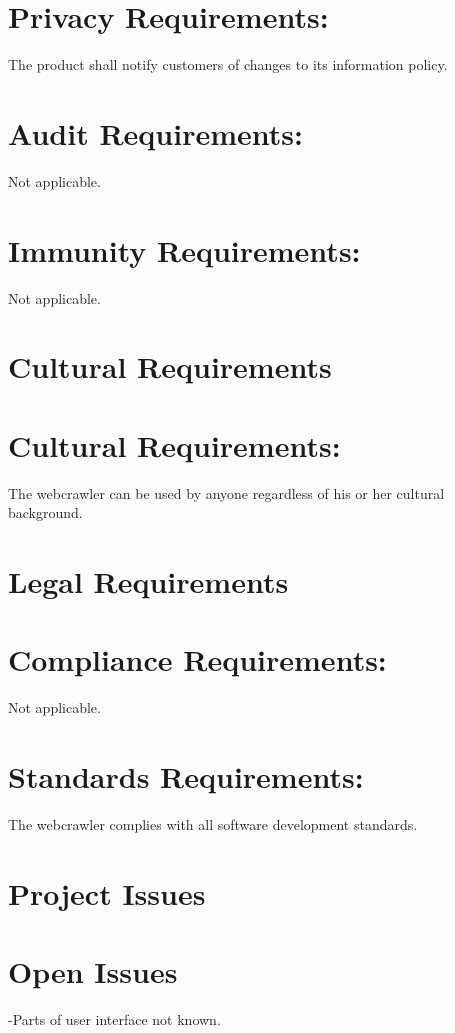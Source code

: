 \documentclass[12pt]{article}
\begin{document}
\section*{Privacy Requirements:}
The product shall notify customers of changes to its information policy.

\section*{Audit Requirements:}
Not applicable.

\section*{Immunity Requirements:}
Not applicable.

\section*{Cultural Requirements}

\section*{Cultural Requirements:}

The webcrawler can be used by anyone regardless of his or her cultural background.

\section*{Legal Requirements }

\section*{Compliance Requirements:}

Not applicable.

\section*{Standards Requirements:}

The webcrawler complies with all software development standards.

\section*{Project Issues }

\section*{Open Issues }
-Parts of user interface not known.
\end{document}
